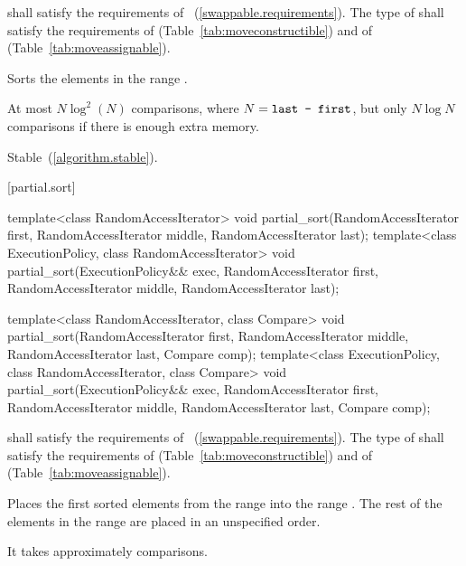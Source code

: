 \begin{itemdescr}
\pnum
\requires
{} shall satisfy the requirements of
~(\ref{swappable.requirements}). The type
of  shall satisfy the requirements of
 (Table~\ref{tab:moveconstructible}) and of
 (Table~\ref{tab:moveassignable}).

\pnum
\effects
Sorts the elements in the range .

\pnum
\complexity
At most $N \log^2(N)$
comparisons, where
$N = \texttt{last - first}$, but only $N \log N$ comparisons if there is enough extra memory.

\pnum
\remarks Stable~(\ref{algorithm.stable}).
\end{itemdescr}

[partial.sort]{}

%
\begin{itemdecl}
template<class RandomAccessIterator>
  void partial_sort(RandomAccessIterator first,
                    RandomAccessIterator middle,
                    RandomAccessIterator last);
template<class ExecutionPolicy, class RandomAccessIterator>
  void partial_sort(ExecutionPolicy&& exec,
                    RandomAccessIterator first,
                    RandomAccessIterator middle,
                    RandomAccessIterator last);

template<class RandomAccessIterator, class Compare>
  void partial_sort(RandomAccessIterator first,
                    RandomAccessIterator middle,
                    RandomAccessIterator last,
                    Compare comp);
template<class ExecutionPolicy, class RandomAccessIterator, class Compare>
  void partial_sort(ExecutionPolicy&& exec,
                    RandomAccessIterator first,
                    RandomAccessIterator middle,
                    RandomAccessIterator last,
                    Compare comp);

\end{itemdecl}

\begin{itemdescr}
\pnum
\requires
{} shall satisfy the requirements of
~(\ref{swappable.requirements}). The type
of  shall satisfy the requirements of
 (Table~\ref{tab:moveconstructible}) and of
 (Table~\ref{tab:moveassignable}).

\pnum
\effects
Places the first
sorted elements from the range
into the range
.
The rest of the elements in the range
are placed in an unspecified order.
%

\pnum
\complexity
It takes approximately
comparisons.
\end{itemdescr}

